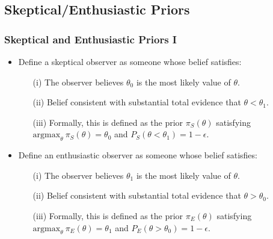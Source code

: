 \documentclass{beamer}
\begin{document}
\subsection{Skeptical/Enthusiastic Priors}
\begin{frame} \frametitle{Skeptical and Enthusiastic Priors I}
	\begin{itemize}
		\item Define a skeptical observer as someone whose belief satisfies:
					\begin{enumerate}
					  \vspace{0.35cm}
						\item[(i)] 		The observer believes $\theta_0$ is the most likely value 
													of $\theta$.
													
						\vspace{0.35cm}							
						\item[(ii)] 	Belief consistent with substantial total evidence that $\theta < \theta_1$.		
						
						\vspace{0.35cm}	
						\item[(iii)] Formally, this is defined as the prior $\pi_{S}(\theta)$ satisfying 
						             $\text{argmax}_\theta~\pi_S(\theta)=\theta_0$  and $P_S(\theta <\theta_1)=1-\epsilon$.					
					\end{enumerate}
					
		\vspace{0.35cm}			
		\item Define an enthusiastic observer as someone whose belief satisfies:
					\begin{enumerate}
					  \vspace{0.35cm}
						\item[(i)] 		The observer believes $\theta_1$ is the most likely value 
													of $\theta$.
													
						\vspace{0.35cm}							
						\item[(ii)] 	Belief consistent with substantial total evidence that $\theta > \theta_0$.		
						
						\vspace{0.35cm}	
					  \item[(iii)] Formally, this is defined as the prior $\pi_{E}(\theta)$ satisfying 
						             $\text{argmax}_\theta~\pi_E(\theta)=\theta_1$ and $P_E(\theta >\theta_0)=1-\epsilon$.							
					\end{enumerate}						
	\end{itemize}
\end{frame}
\end{document}
